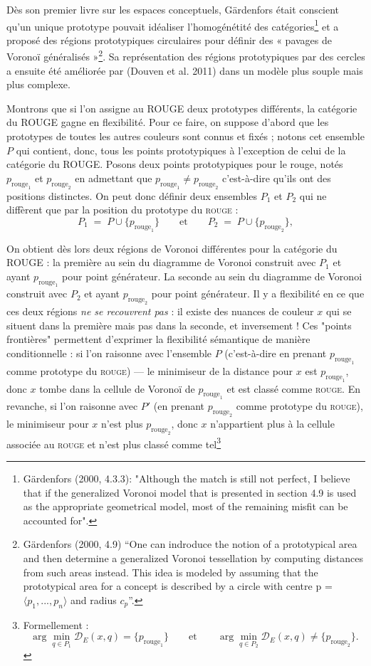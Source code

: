 \documentclass{article}
\begin{document}
Dès son premier livre sur les espaces conceptuels, Gärdenfors était conscient qu’un unique prototype pouvait idéaliser l'homogénétité des catégories\footnote{Gärdenfors (2000, 4.3.3): "Although the match is still not perfect, I believe that if the generalized Voronoi model that is presented in section 4.9 is used as the appropriate geometrical model, most of the remaining misfit can be accounted for".} et a proposé des régions prototypiques circulaires pour définir des « pavages de Voronoï généralisés »\footnote{Gärdenfors (2000, 4.9) “One can indroduce the notion of a prototypical area and then determine a generalized Voronoi tessellation by computing distances from such areas instead. This idea is modeled by assuming that the prototypical area for a concept is described by a circle with centre p = $\langle p_1,... , p_n \rangle$ and radius $c_p$”. }. Sa représentation des régions prototypiques par des cercles a ensuite été améliorée par (Douven et al. 2011) dans un modèle plus souple mais plus complexe.

\par
Montrons que si l'on assigne au ROUGE deux prototypes différents, la catégorie du ROUGE gagne en flexibilité.
Pour ce faire, on suppose d'abord que les prototypes de toutes les autres couleurs sont connus et fixés ; notons cet ensemble  \(P\) qui contient, donc, tous les points prototypiques à l'exception de celui de la catégorie du ROUGE. Posons deux points prototypiques pour le rouge, notés $p_{\text{rouge}_1}$ et $ p_{\text{rouge}_2}$ en admettant que \(p_{\text{rouge}_1}\neq p_{\text{rouge}_2}\) c'est-à-dire qu'ils ont des positions distinctes. On peut donc définir deux ensembles $P_1$ et $P_2$ qui ne diffèrent que par la position du prototype du \textsc{rouge} :
\[
P_1 \;=\; P \cup \{p_{\text{rouge}_1}\}
\qquad\text{et}\qquad
P_2 \;=\; P \cup \{p_{\text{rouge}_2}\},
\]

On obtient dès lors deux régions de Voronoi différentes pour la catégorie du ROUGE : la première au sein du diagramme de Voronoi construit avec $P_1$ et ayant $p_{\text{rouge}_1}$ pour point générateur. La seconde au sein du diagramme de Voronoi construit avec $P_2$ et ayant $p_{\text{rouge}_2}$ pour point générateur. Il y a flexibilité en ce que ces deux régions \textit{ne se recouvrent pas} : il existe des nuances de couleur $x$ qui se situent dans la première mais pas dans la seconde, et inversement ! Ces "points frontières" permettent d'exprimer la flexibilité sémantique de manière conditionnelle : si l'on raisonne avec l'ensemble \(P\) (c'est-à-dire en prenant \(p_{\text{rouge}_1}\) comme prototype du \textsc{rouge}) — le minimiseur de la distance pour \(x\) est \(p_{\text{rouge}_1}\), donc \(x\) tombe dans la cellule de Voronoï de \(p_{\text{rouge}_1}\) et est classé comme \textsc{rouge}. En revanche, si l'on raisonne avec \(P'\) (en prenant \(p_{\text{rouge}_2}\) comme prototype du \textsc{rouge}), le minimiseur pour \(x\) n'est plus \(p_{\text{rouge}_2}\), donc \(x\) n'appartient plus à la cellule associée au \textsc{rouge} et n'est plus classé comme tel\footnote{Formellement :\[
\arg\min_{q\in P_1}\mathcal{D}_E(x,q)=\{p_{\text{rouge}_1}\}
\qquad\text{et}\qquad
\arg\min_{q\in P_2}\mathcal{D}_E(x,q)\neq\{p_{\text{rouge}_2}\}.
\]}
\end{document}
